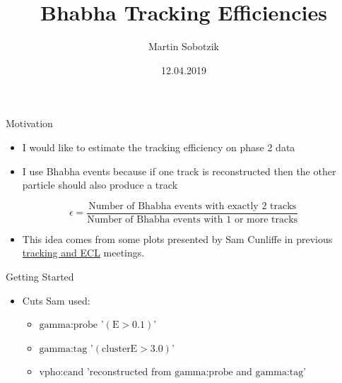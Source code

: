 \documentclass[10pt]{beamer}
\title{Bhabha Tracking Efficiencies}
\date{12.04.2019}
\author{Martin Sobotzik}
\institute{Johannes Gutenberg Universit\"at Mainz}
\begin{document}
\maketitle
{%



\begin{frame}{Motivation}

\begin{itemize}	
	\item I would like to estimate the tracking efficiency on phase 2 data
	\item I use Bhabha events because if one track is reconstructed then the other particle should also produce a track

\end{itemize}
	\begin{equation*}
		\epsilon = \frac{\textrm{Number of Bhabha events with exactly 2 tracks}}{\textrm{Number of Bhabha events with 1 or more tracks}}
	\end{equation*}
	
	\begin{itemize}
		\item  This idea comes from some plots presented by Sam Cunliffe in previous  \href{https://confluence.desy.de/display/BI/ECL+Meetings?preview=/84320165/109161400/SCunliffe181123-ECL.pdf}{tracking and ECL} meetings.
	\end{itemize}





\end{frame}
	
\begin{frame}{Getting Started}
	
\begin{itemize} 
	\item Cuts Sam used:
	
	
	\begin{itemize}
		\item $\textrm{gamma:probe}$ '$(\textrm{E} > 0.1 )$'
		\item $\textrm{gamma:tag}$ '$(\textrm{clusterE} > 3.0)$'
		\item $\textrm{vpho:cand}$ 'reconstructed from $\textrm{gamma:probe}$ and $\textrm{gamma:tag}$'
	\end{itemize}


\end{itemize}
\end{frame}}
\end{document}
